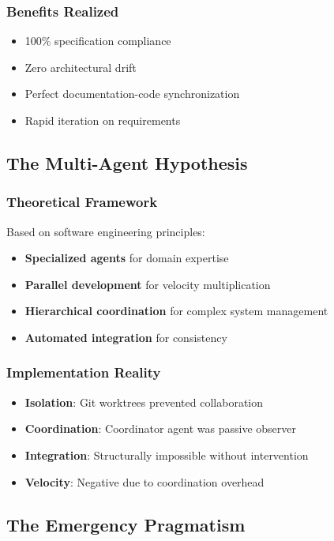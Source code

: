 \documentclass[11pt]{article}
\begin{document}
\subsubsection{Benefits Realized}
\label{sec:orgc634e27}
\begin{itemize}
\item 100\% specification compliance
\item Zero architectural drift
\item Perfect documentation-code synchronization
\item Rapid iteration on requirements
\end{itemize}
\subsection{The Multi-Agent Hypothesis}
\label{sec:org54e484f}
\subsubsection{Theoretical Framework}
\label{sec:orgce3790d}
Based on software engineering principles:
\begin{itemize}
\item \textbf{\textbf{Specialized agents}} for domain expertise
\item \textbf{\textbf{Parallel development}} for velocity multiplication
\item \textbf{\textbf{Hierarchical coordination}} for complex system management
\item \textbf{\textbf{Automated integration}} for consistency
\end{itemize}
\subsubsection{Implementation Reality}
\label{sec:orgfb6e799}
\begin{itemize}
\item \textbf{\textbf{Isolation}}: Git worktrees prevented collaboration
\item \textbf{\textbf{Coordination}}: Coordinator agent was passive observer
\item \textbf{\textbf{Integration}}: Structurally impossible without intervention
\item \textbf{\textbf{Velocity}}: Negative due to coordination overhead
\end{itemize}
\subsection{The Emergency Pragmatism}
\label{sec:org134f602}
\end{document}

